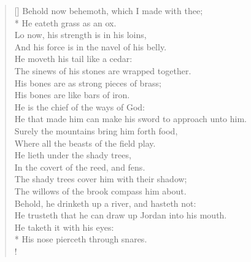 \documentclass[MAIN]{subfiles}
\begin{document}
\begin{verse}[\versewidth]
Behold now behemoth, which I made with thee;\\*
\vin He eateth grass as an ox.\\
Lo now, his strength is in his loins,\\
\vin And his force is in the navel of his belly.\\
He moveth his tail like a cedar:\\
\vin The sinews of his stones are wrapped together.\\
His bones are as strong pieces of brass;\\
\vin His bones are like bars of iron.\\
He is the chief of the ways of God:\\
\vin He that made him can make his sword to approach unto him.\\
Surely the mountains bring him forth food,\\
\vin Where all the beasts of the field play.\\
He lieth under the shady trees,\\
\vin In the covert of the reed, and fens.\\
The shady trees cover him with their shadow;\\
\vin The willows of the brook compass him about.\\
Behold, he drinketh up a river, and hasteth not:\\
\vin He trusteth that he can draw up {\sc Jordan} into his mouth.\\
He taketh it with his eyes:\\*
\vin His nose pierceth through snares.\\!


\end{verse}
\end{document}
